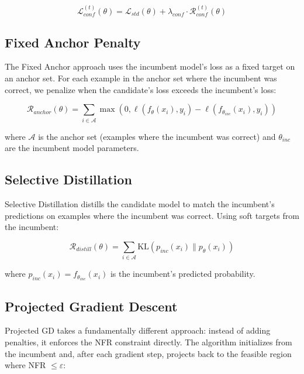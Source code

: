 \documentclass[12pt, letterpaper]{article}
\theoremstyle{remark}
\begin{document}
\begin{equation}
\mathcal{L}_{conf}^{(t)}(\theta) = \mathcal{L}_{std}(\theta) + \lambda_{conf} \cdot \mathcal{R}_{conf}^{(t)}(\theta)
\end{equation}

\subsection{Fixed Anchor Penalty}

The Fixed Anchor approach uses the incumbent model's loss as a fixed target on an anchor set. For each example in the anchor set where the incumbent was correct, we penalize when the candidate's loss exceeds the incumbent's loss:

\begin{equation}
\mathcal{R}_{anchor}(\theta) = \sum_{i \in \mathcal{A}} \max(0, \ell(f_\theta(x_i), y_i) - \ell(f_{\theta_{inc}}(x_i), y_i))
\end{equation}

where $\mathcal{A}$ is the anchor set (examples where the incumbent was correct) and $\theta_{inc}$ are the incumbent model parameters.

\subsection{Selective Distillation}

Selective Distillation distills the candidate model to match the incumbent's predictions on examples where the incumbent was correct. Using soft targets from the incumbent:

\begin{equation}
\mathcal{R}_{distill}(\theta) = \sum_{i \in \mathcal{A}} \text{KL}(p_{inc}(x_i) \| p_\theta(x_i))
\end{equation}

where $p_{inc}(x_i) = f_{\theta_{inc}}(x_i)$ is the incumbent's predicted probability.

\subsection{Projected Gradient Descent}

Projected GD takes a fundamentally different approach: instead of adding penalties, it enforces the NFR constraint directly. The algorithm initializes from the incumbent and, after each gradient step, projects back to the feasible region where NFR $\leq \varepsilon$:
\end{document}
